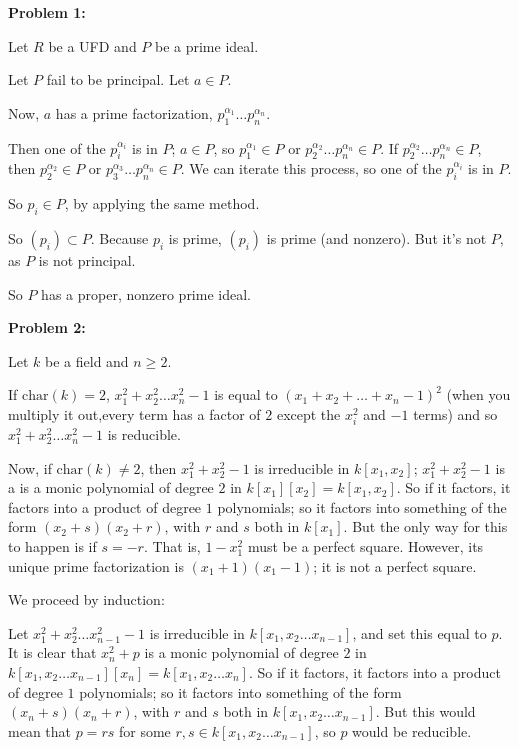 \documentclass[a4paper,12pt]{article}
\newcommand{\tab}{\hspace{4mm}} %
\newcommand{\shunt}{\vspace{20mm}}
\newcommand{\al}{\alpha} %
\begin{document}
{\bf Problem 1:} 

Let $R$ be a UFD and $P$ be a prime ideal.

Let $P$ fail to be principal. Let $a \in P$.

Now, $a$ has a prime factorization, $p_1^{\al_1}\ldots p_n^{\al_n}$.

Then one of the $p_i^{\al_i}$ is in $P$; $a \in P$, so $p_1^{\al_1} \in P$ or $p_2^{\al_2}\ldots p_n^{\al_n} \in P$. If $p_2^{\al_2}\ldots p_n^{\al_n} \in P$, then $p_2^{\al_2} \in P$ or $p_3^{\al_3}\ldots p_n^{\al_n} \in P$. We can iterate this process, so one of the $p_i^{\al_i}$ is in $P$.

So $p_i \in P$, by applying the same method.

So $(p_i) \subset P$. Because $p_i$ is prime, $(p_i)$ is prime (and nonzero). But it's not $P$, as $P$ is not principal.

So $P$ has a proper, nonzero prime ideal. 

\shunt

{\bf Problem 2:} 

Let $k$ be a field and $n \geq 2$.

If $\text{char}(k) = 2$, $x_1^2 + x_2^2 \ldots x_n^2 -1$ is equal to $(x_1+x_2+\ldots+x_n-1)^2$ (when you multiply it out,every term has a factor of $2$ except the $x_i^2$ and $-1$ terms) and so $x_1^2 + x_2^2 \ldots x_n^2 -1$ is reducible.

Now, if $\text{char}(k) \neq 2$, then $x_1^2 +x_2^2 -1$ is irreducible in $k[x_1,x_2]$; $x_1^2+x_2^2 -1$ is a is a monic polynomial of degree $2$ in $k[x_1][x_2] = k[x_1, x_2]$. So if it factors, it factors into a product of degree $1$ polynomials; so it factors into something of the form $(x_2+s)(x_2+r)$, with $r$ and $s$ both in $k[x_1]$. But the only way for this to happen is if $s=-r$. That is, $1-x_1^2$ must be a perfect square. However, its unique prime factorization is $(x_1+1)(x_1-1)$; it is not a perfect square.

We proceed by induction:

\tab Let $x_1^2 + x_2^2 \ldots x_{n-1}^2 -1$ is irreducible in $k[x_1, x_2 \ldots x_{n-1}]$, and set this equal to $p$. It is clear that $x_n^2+p$ is a monic polynomial of degree $2$ in $k[x_1, x_2 \ldots x_{n-1}][x_n] = k[x_1, x_2 \ldots x_{n}]$. So if it factors, it factors into a product of degree $1$ polynomials; so it factors into something of the form $(x_n+s)(x_n+r)$, with $r$ and $s$ both in $k[x_1, x_2 \ldots x_{n-1}]$. But this would mean that $p=rs$ for some $r,s \in k[x_1, x_2 \ldots x_{n-1}]$, so $p$ would be reducible.
\end{document}
